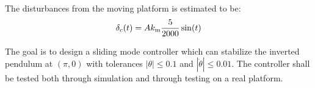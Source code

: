 The disturbances from the moving platform is estimated to be:
\begin{equation}
        \delta_c(t) = A k_{\mathrm{m}} \frac{5}{2000} \sin(t)
\end{equation}

The goal is to design a sliding mode controller which can stabilize the inverted pendulum at $(\pi,0)$ with tolerances $|\theta| \leq 0.1$ and $|\dot{\theta}| \leq 0.01$. The controller shall be tested both through simulation and through testing on a real platform.